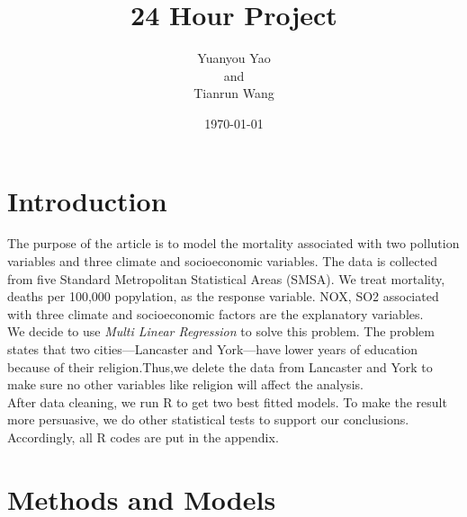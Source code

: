 \documentclass[12pt,a4paper]{article}
\title{24 Hour Project}
\author{Yuanyou Yao\\
and\\
Tianrun Wang}
\date{\today}
\begin{document}
\maketitle
\tableofcontents
\newpage
\section{Introduction}
The purpose of the article is to model the mortality associated with two pollution variables and three climate and socioeconomic variables. The data is collected from five Standard Metropolitan Statistical Areas (SMSA). We treat mortality, deaths per 100,000 popylation, as the response variable. NOX, SO2 associated with three climate and socioeconomic factors are the explanatory variables.\\
\newline
We decide to use \emph{Multi Linear Regression} to solve this problem. The problem states that two cities---Lancaster and York---have lower years of education because of their religion.Thus,we delete the data from Lancaster and York to make sure no other variables like religion will affect the analysis.   \\
\newline
After data cleaning, we run R to get two best fit{}ted models. To make the result more persuasive, we do other statistical tests to support our conclusions. Accordingly, all R codes are put in the appendix.
\newpage
\section{Methods and Models}
\end{document}

